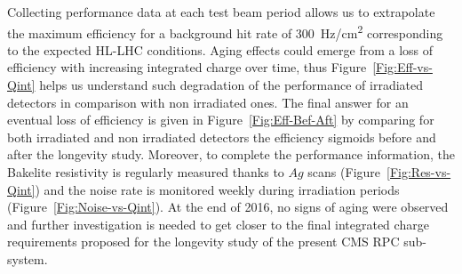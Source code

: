      Collecting performance data at each test beam period allows us to extrapolate the maximum efficiency for a background hit rate of \SI{300}{Hz/cm^2} corresponding to the expected HL-LHC conditions. Aging effects could emerge from a loss of efficiency with increasing integrated charge over time, thus Figure~\ref{Fig:Eff-vs-Qint} helps us understand such degradation of the performance of irradiated detectors in comparison with non irradiated ones. The final answer for an eventual loss of efficiency is given in Figure~\ref{Fig:Eff-Bef-Aft} by comparing for both irradiated and non irradiated detectors the efficiency sigmoids before and after the longevity study. Moreover, to complete the performance information, the Bakelite resistivity is regularly measured thanks to $Ag$ scans (Figure~\ref{Fig:Res-vs-Qint}) and the noise rate is monitored weekly during irradiation periods (Figure~\ref{Fig:Noise-vs-Qint}). At the end of 2016, no signs of aging were observed and further investigation is needed to get closer to the final integrated charge requirements proposed for the longevity study of the present CMS RPC sub-system.\\
    
